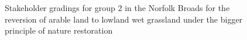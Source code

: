 \documentclass[
  12pt,
  letterpaper,
  DIV=11,
  numbers=noendperiod]{scrartcl}
\begin{document}
\begin{figure}[H]


\caption{\label{fig-BroadsArBigG2}Stakeholder gradings for group 2 in
the Norfolk Broads for the reversion of arable land to lowland wet
grassland under the bigger principle of nature restoration}

\end{figure}%
\end{document}
